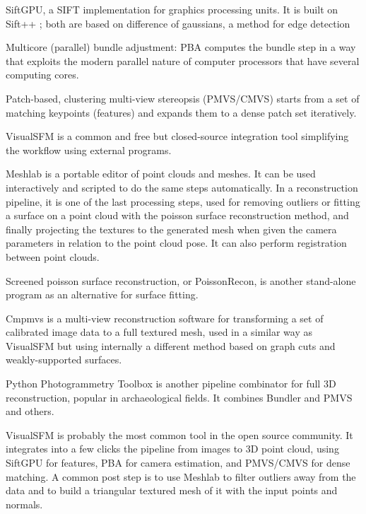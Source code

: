 SiftGPU, a SIFT implementation for graphics processing units. \cite{changchang2007siftgpu} It is built on Sift++ \cite{vedaldi2011sift++}; both are based on difference of gaussians, a method for edge detection \cite{marr1980theory}

Multicore (parallel) bundle adjustment: PBA computes the bundle step in a way that exploits the modern parallel nature of computer processors that have several computing cores. \cite{wu2011multicore}

Patch-based, clustering multi-view stereopsis (PMVS/CMVS) starts from a set of matching keypoints (features) and expands them to a dense patch set iteratively. \cite{furukawa2010accurate,furukawa2012patch}

VisualSFM \cite{wu2013towards} is a common and free but closed-source integration tool simplifying the workflow using external programs.

Meshlab \cite{meshlab} is a portable editor of point clouds and meshes.
It can be used interactively and scripted to do the same steps automatically.
In a reconstruction pipeline, it is one of the last processing steps, used for removing outliers or fitting a surface on a point cloud with the poisson surface reconstruction method, and finally projecting the textures to the generated mesh when given the camera parameters in relation to the point cloud pose.
It can also perform registration between point clouds.

Screened poisson surface reconstruction, or PoissonRecon, is another stand-alone program as an alternative for surface fitting. \cite{kazhdan2013screened}

Cmpmvs is a multi-view reconstruction software for transforming a set of calibrated image data to a full textured mesh, used in a similar way as VisualSFM but using internally a different method based on graph cuts and weakly-supported surfaces.
\cite{jancosek2011multi}

Python Photogrammetry Toolbox is another pipeline combinator for full 3D reconstruction, popular in archaeological fields. It combines Bundler and PMVS and others. \cite{moulon2011python}

VisualSFM is probably the most common tool in the open source community.
It integrates into a few clicks the pipeline from images to 3D point cloud, using SiftGPU for features, PBA for camera estimation, and PMVS/CMVS for dense matching.
A common post step is to use Meshlab to filter outliers away from the data and to build a triangular textured mesh of it with the input points and normals.

